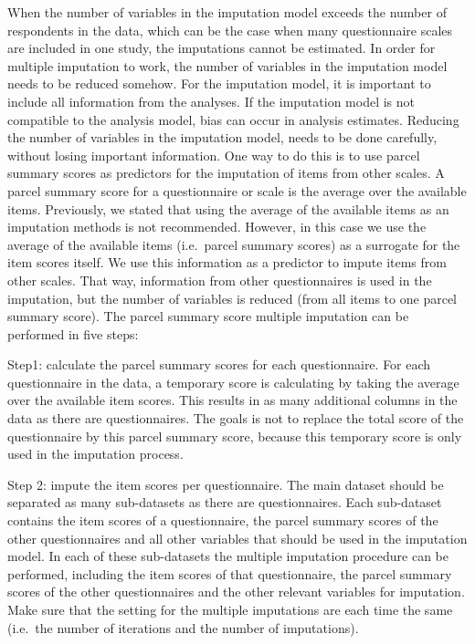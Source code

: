 \documentclass[]{book}
\begin{document}
When the number of variables in the imputation model exceeds the number
of respondents in the data, which can be the case when many
questionnaire scales are included in one study, the imputations cannot
be estimated. In order for multiple imputation to work, the number of
variables in the imputation model needs to be reduced somehow. For the
imputation model, it is important to include all information from the
analyses. If the imputation model is not compatible to the analysis
model, bias can occur in analysis estimates. Reducing the number of
variables in the imputation model, needs to be done carefully, without
losing important information. One way to do this is to use parcel
summary scores as predictors for the imputation of items from other
scales. A parcel summary score for a questionnaire or scale is the
average over the available items. Previously, we stated that using the
average of the available items as an imputation methods is not
recommended. However, in this case we use the average of the available
items (i.e.~parcel summary scores) as a surrogate for the item scores
itself. We use this information as a predictor to impute items from
other scales. That way, information from other questionnaires is used in
the imputation, but the number of variables is reduced (from all items
to one parcel summary score). The parcel summary score multiple
imputation can be performed in five steps:

Step1: calculate the parcel summary scores for each questionnaire. For
each questionnaire in the data, a temporary score is calculating by
taking the average over the available item scores. This results in as
many additional columns in the data as there are questionnaires. The
goals is not to replace the total score of the questionnaire by this
parcel summary score, because this temporary score is only used in the
imputation process.

Step 2: impute the item scores per questionnaire. The main dataset
should be separated as many sub-datasets as there are questionnaires.
Each sub-dataset contains the item scores of a questionnaire, the parcel
summary scores of the other questionnaires and all other variables that
should be used in the imputation model. In each of these sub-datasets
the multiple imputation procedure can be performed, including the item
scores of that questionnaire, the parcel summary scores of the other
questionnaires and the other relevant variables for imputation. Make
sure that the setting for the multiple imputations are each time the
same (i.e.~the number of iterations and the number of imputations).
\end{document}
